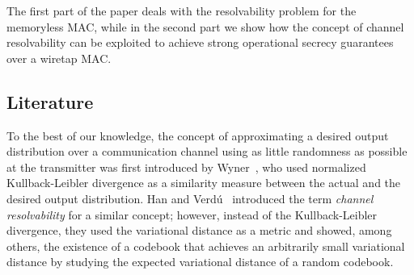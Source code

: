 \documentclass[journal]{IEEEtran}
\newcommand{\codebookBlocklength}{n}
\begin{document}

The first part of the paper deals with the resolvability problem for
the memoryless MAC, while in the second part we show how the concept
of channel resolvability can be exploited to achieve strong
operational secrecy guarantees over a wiretap MAC.


\subsection{Literature}
\label{section:literature}

To the best of our knowledge, the concept of approximating a desired
output distribution over a communication channel using as little
randomness as possible at the transmitter was first introduced by
Wyner~\cite{WynerCommonInformation}, who used normalized
Kullback-Leibler divergence as a similarity measure between the actual
and the desired output distribution. 
Han and Verdú~\cite{HanApproximation} introduced the term
\emph{channel resolvability} for a similar concept; however, instead
of the Kullback-Leibler divergence, they used the variational distance
as a metric and showed, among others, the existence of a codebook that
achieves an arbitrarily small variational distance by studying the
expected variational distance of a random codebook.
\end{document}
